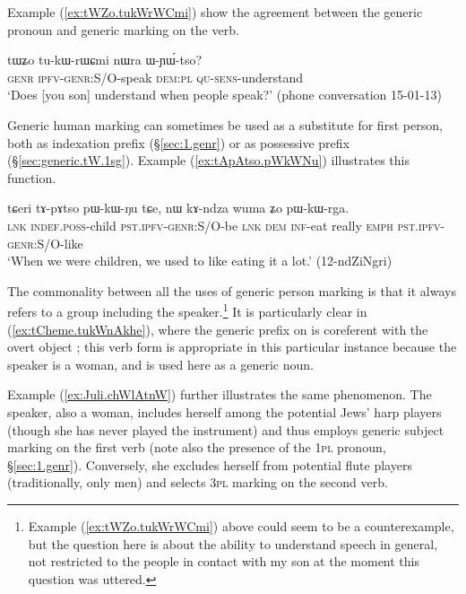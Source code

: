 Example (\ref{ex:tWZo.tukWrWCmi}) show the agreement between the generic pronoun  and generic marking on the verb.

\begin{exe}
\ex   \label{ex:tWZo.tukWrWCmi}
 \gll  tɯʑo tu-kɯ-rɯɕmi nɯra ɯ-ɲɯ́-tso? \\
 \textsc{genr} \textsc{ipfv}-\textsc{genr}:S/O-speak \textsc{dem}:\textsc{pl} \textsc{qu}-\textsc{sens}-understand \\
 \glt `Does [you son] understand when people speak?' (phone conversation 15-01-13)
\end{exe}

Generic human marking can sometimes be used as a substitute for first person, both as indexation prefix (§\ref{sec:1.genr}) or as possessive prefix (§\ref{sec:generic.tW.1sg}). Example (\ref{ex:tApAtso.pWkWNu}) illustrates this function.

\begin{exe}
\ex   \label{ex:tApAtso.pWkWNu}
 \gll   tɕeri tɤ-pɤtso pɯ-kɯ-ŋu tɕe, nɯ kɤ-ndza wuma ʑo pɯ-kɯ-rga. \\
\textsc{lnk} \textsc{indef}.\textsc{poss}-child \textsc{pst}.\textsc{ipfv}-\textsc{genr}:S/O-be \textsc{lnk} \textsc{dem} \textsc{inf}-eat really \textsc{emph} \textsc{pst}.\textsc{ipfv}-\textsc{genr}:S/O-like \\
\glt `When we were children, we used to like eating it a lot.' (12-ndZiNgri) 
\end{exe}

The commonality between all the uses of generic person marking is that it always refers to a group including the speaker.\footnote{Example (\ref{ex:tWZo.tukWrWCmi}) above could seem to be a counterexample, but the question here is about the ability to understand speech in general, not restricted to the people in contact with my son at the moment this question was uttered. } It is particularly clear in (\ref{ex:tCheme.tukWnAkhe}), where the generic prefix  on   is coreferent with the overt object ; this verb form is appropriate in this particular instance because the speaker is a woman, and  is used here as a generic noun.

Example (\ref{ex:Juli.chWlAtnW}) further illustrates the same phenomenon. The speaker, also a woman, includes herself among the potential Jews' harp players (though she has never played the instrument) and thus employs generic subject marking on the first verb (note also the presence of the \textsc{1pl} pronoun, §\ref{sec:1.genr}). Conversely, she excludes herself from potential flute players (traditionally, only men) and selects \textsc{3pl} marking on the second verb. 

